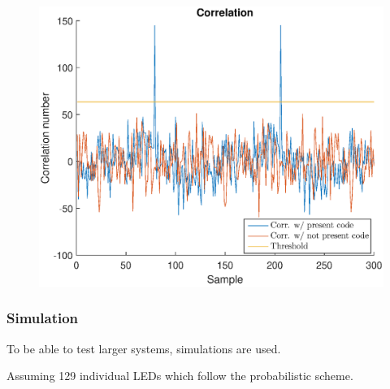 \documentclass{beamer}
\begin{document}
\begin{frame}
\begin{figure}[!tbp]
\begin{minipage}[b]{0.4\textwidth}
		    \includegraphics[width=\textwidth]{../chapters/evaluation-chapters/hardware/ac/correlation-ac-testbed.eps}
		  \end{minipage}
		\end{figure}



	\end{frame}







	\begin{frame}\frametitle{Simulation}
		
		To be able to test larger systems, simulations are used.

		Assuming 129 individual LEDs which follow the probabilistic scheme.

	\end{frame}
\end{document}
